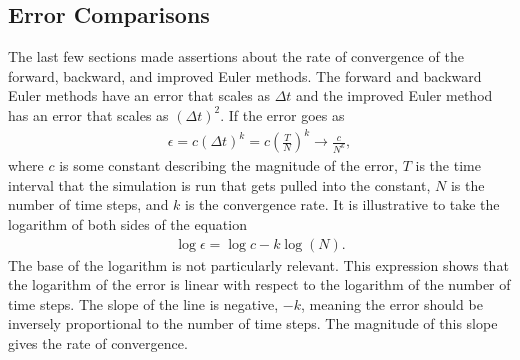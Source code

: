 \subsection{Error Comparisons}

The last few sections made assertions about the rate of convergence of the forward, backward, and improved Euler methods. The forward and backward Euler methods have an error that scales as $\Delta t$ and the improved Euler method has an error that scales as $(\Delta t)^2$. If the error goes as
\begin{align}
  \epsilon = c ( \Delta t )^k = c \left( \frac{T}{N} \right)^k \rightarrow \frac{c}{N^{k}} \nonumber,
\end{align}
where $c$ is some constant describing the magnitude of the error, $T$ is the time interval that the simulation is run that gets pulled into the constant, $N$ is the number of time steps, and $k$ is the convergence rate. It is illustrative to take the logarithm of both sides of the equation
\begin{align}
  \log \epsilon = \log c - k \log( N ). \nonumber
\end{align}
The base of the logarithm is not particularly relevant. This expression shows that the logarithm of the error is linear with respect to the logarithm of the number of time steps. The slope of the line is negative, $-k$, meaning the error should be inversely proportional to the number of time steps. The magnitude of this slope gives the rate of convergence.

